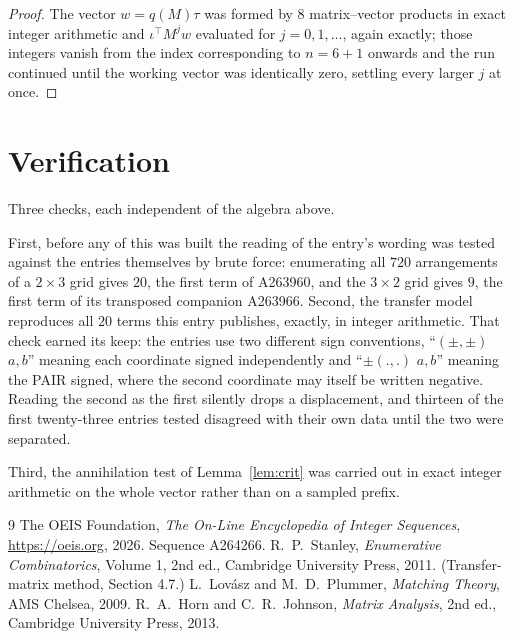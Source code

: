 \documentclass[11pt,a4paper]{article}
\theoremstyle{plain}
\theoremstyle{definition}
\begin{document}
\begin{proof}
The vector $w=q(M)\tau$ was formed by $8$ matrix--vector products in exact integer
arithmetic and $\iota^{\!\top}M^{j}w$ evaluated for $j=0,1,\dots$, again exactly; those
integers vanish from the index corresponding to $n=6+1$ onwards and the run continued
until the working vector was identically zero, settling every larger $j$ at once.
\end{proof}

\section{Verification}

Three checks, each independent of the algebra above.

First, before any of this was built the reading of the entry's wording was tested against the
entries themselves by brute force: enumerating all $720$ arrangements of a $2\times3$ grid
gives $20$, the first term of A263960, and the $3\times2$ grid gives $9$, the first term of its
transposed companion A263966. Second, the transfer model reproduces all $20$ terms this
entry publishes, exactly, in integer arithmetic. That check earned its keep: the entries use
two different sign conventions, ``$(\pm,\pm)$ $a,b$'' meaning each coordinate signed
independently and ``$\pm(.,.)$ $a,b$'' meaning the PAIR signed, where the second coordinate may
itself be written negative. Reading the second as the first silently drops a displacement, and
thirteen of the first twenty-three entries tested disagreed with their own data until the two
were separated.

Third, the annihilation test of Lemma~\ref{lem:crit} was carried out in exact integer
arithmetic on the whole vector rather than on a sampled prefix.

\begin{thebibliography}{9}
 The OEIS Foundation, \emph{The On-Line Encyclopedia of Integer
Sequences}, \url{https://oeis.org}, 2026. Sequence A264266.
 R.~P.~Stanley, \emph{Enumerative Combinatorics}, Volume 1, 2nd ed.,
Cambridge University Press, 2011. (Transfer-matrix method, Section 4.7.)
 L.~Lov\'asz and M.~D.~Plummer, \emph{Matching Theory}, AMS Chelsea, 2009.
 R.~A.~Horn and C.~R.~Johnson, \emph{Matrix Analysis}, 2nd ed., Cambridge
University Press, 2013.
\end{thebibliography}
\end{document}

